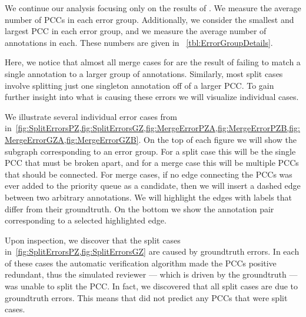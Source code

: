     We continue our analysis focusing only on the results of .
    We measure the average number of PCCs in each error group.
    Additionally, we consider the smallest and largest PCC in each error group, and we measure the average number
      of annotations in each.
    These numbers are given in ~\cref{tbl:ErrorGroupDetails}.

    Here, we notice that almost all merge cases for  are the result of failing to match a single
      annotation to a larger group of annotations.
    Similarly, most split cases involve splitting just one singleton annotation off of a larger PCC.
    To gain further insight into what is causing these errors we will visualize individual cases.


    \ErrorSizeDetails{}

    \ErrorGroupDetails{}

    \FloatBarrier{}

    We illustrate several individual error cases from 
    in~\cref{fig:SplitErrorsPZ,fig:SplitErrorsGZ,fig:MergeErrorPZA,fig:MergeErrorPZB,fig:MergeErrorGZA,fig:MergeErrorGZB}.
    On the top of each figure we will show the subgraph corresponding to an error group.
    For a split case this will be the single PCC that must be broken apart, and for a merge case this will be
      multiple PCCs that should be connected.
    For merge cases, if no edge connecting the PCCs was ever added to the priority queue as a candidate, then we
      will insert a dashed edge between two arbitrary annotations.
    We will highlight the edges with labels that differ from their groundtruth.
    On the bottom we show the annotation pair corresponding to a selected highlighted edge.

    Upon inspection, we discover that the split cases in~\cref{fig:SplitErrorsPZ,fig:SplitErrorsGZ} are caused by
      groundtruth errors.
    In each of these cases the automatic verification algorithm made the PCCs positive redundant, thus the
      simulated reviewer --- which is driven by the groundtruth --- was unable to split the PCC.
    In fact, we discovered that all split cases are due to groundtruth errors.
    This means that  did not predict any PCCs that were split cases.

